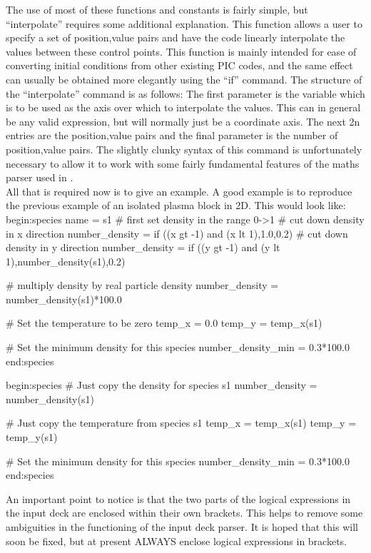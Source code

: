 \documentclass[12pt,a4paper]{article}
\newcommand{\EPOCH}{{\color{warwickdark}\fontfamily{phv}\selectfont{EPOCH}}}
\newenvironment{boxverbatim}{\lboxverbatim{none}}{\endlboxverbatim}
\begin{document}
The use of most of these functions and constants is fairly simple, but
``interpolate'' requires some additional explanation. This function allows a
user to specify a set of position,value pairs and have the code linearly
interpolate the values between these control points. This function is mainly
intended for ease of converting initial conditions from other existing PIC
codes, and the same effect can usually be obtained more elegantly using the
``if'' command. The structure of the ``interpolate'' command is as follows:
The first parameter is the variable which is to be used as the axis over which
to interpolate the values. This can in general be any valid expression, but
will normally just be a coordinate axis. The next 2n entries are the
position,value pairs and the final parameter is the number of position,value
pairs. The slightly clunky syntax of this command is unfortunately necessary to
allow it to work with some fairly fundamental features of the maths parser
used in {\EPOCH}.\\
All that is required now is to give an example.
A good example is to reproduce
the previous example of an isolated plasma block in 2D. This would look like:
\begin{boxverbatim}
begin:species
   name = s1
   # first set density in the range 0->1
   # cut down density in x direction
   number_density = if ((x gt -1) and (x lt 1),1.0,0.2)
   # cut down density in y direction
   number_density = if ((y gt -1) and (y lt 1),number_density(s1),0.2)

   # multiply density by real particle density
   number_density = number_density(s1)*100.0

   # Set the temperature to be zero
   temp_x = 0.0
   temp_y = temp_x(s1)

   # Set the minimum density for this species
   number_density_min = 0.3*100.0
end:species

begin:species
   # Just copy the density for species s1
   number_density = number_density(s1)

   # Just copy the temperature from species s1
   temp_x = temp_x(s1)
   temp_y = temp_y(s1)

   # Set the minimum density for this species
   number_density_min = 0.3*100.0
end:species
\end{boxverbatim}

An important point to notice is that the two parts of the logical expressions
in the input deck are enclosed within their own brackets. This helps to remove
some ambiguities in the functioning of the input deck parser. It is hoped that
this will soon be fixed, but at present ALWAYS enclose logical expressions in
brackets.
\end{document}
